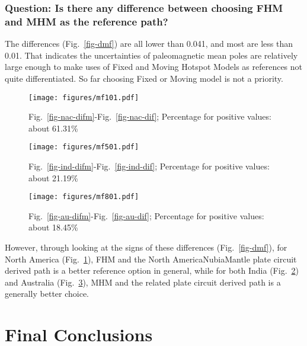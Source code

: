 \subsubsection{Question: Is there any difference between choosing FHM and MHM
as the reference path?}

The differences (Fig.~\ref{fig-dmf}) are all lower than 0.041, and most are less
than 0.01. That indicates the uncertainties of paleomagnetic mean poles are
relatively large enough to make uses of Fixed and Moving Hotspot Models as
references not quite differentiated. So far choosing Fixed or Moving model is
not a priority.

\begin{figure*}
	\centering
	\begin{subfigure}{1.01\textwidth}
		\texttt{[image: figures/mf101.pdf]}
		\caption{Fig.~\ref{fig-nac-difm}-Fig.~\ref{fig-nac-dif}; Percentage for
		positive values: about 61.31\%}\label{fig-mf101}
	\end{subfigure}
	\vspace{.1em}
	\begin{subfigure}{1.01\textwidth}
		\texttt{[image: figures/mf501.pdf]}
		\caption{Fig.~\ref{fig-ind-difm}-Fig.~\ref{fig-ind-dif}; Percentage for
		positive values: about 21.19\%}\label{fig-mf501}
	\end{subfigure}
	\vspace{.1em}
	\begin{subfigure}{1.01\textwidth}
		\texttt{[image: figures/mf801.pdf]}
		\caption{Fig.~\ref{fig-au-difm}-Fig.~\ref{fig-au-dif}; Percentage for
		positive values: about 18.45\%}\label{fig-mf801}
	\end{subfigure}
	\caption[Differences between results from FHM and MHM]{Differences between
	results from FHM (Fig.~\ref{fig-dif}) and MHM (Fig.~\ref{fig-difm}) as
	reference paths.}\label{fig-dmf}
\end{figure*}

However, through looking at the signs of these differences
(Fig.~\ref{fig-dmf}), for North America (Fig.~\ref{fig-mf101}), FHM and the
North America\textendash{}Nubia\textendash{}Mantle plate circuit derived
path is a better reference option in general, while for both India
(Fig.~\ref{fig-mf501}) and Australia (Fig.~\ref{fig-mf801}), MHM and the related
plate circuit derived path is a generally better choice.


\section{Final Conclusions}

